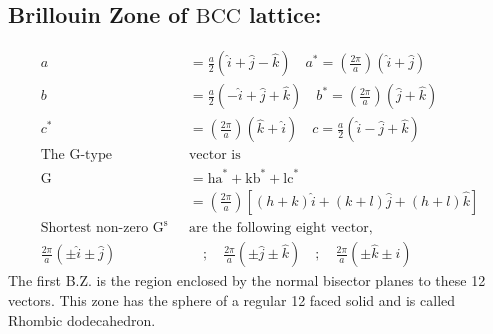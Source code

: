 \subsection{Brillouin Zone of $\mathrm{BCC}$ lattice:}
\begin{align*}
a&=\frac{a}{2}(\hat{i}+\hat{j}-\hat{k}) \quad a^{*}=\left(\frac{2 \pi}{a}\right)(\hat{i}+\hat{j})\\
b&=\frac{a}{2}(-\hat{i}+\hat{j}+\hat{k}) \quad b^{*}=\left(\frac{2 \pi}{a}\right)(\hat{j}+\hat{k})\\
c^{*}&=\left(\frac{2 \pi}{a}\right)(\hat{k}+\hat{i}) \quad  c=\frac{a}{2}(\hat{i}-\hat{j}+\hat{k})\\
\text{The G-type }&\text{vector is}\\
\mathrm{G}&=\mathrm{ha}^{*}+\mathrm{kb}^{*}+\mathrm{lc}^{*}\\
&= \left(\frac{2 \pi}{a}\right)[(h+k) \hat{i}+(k+l) \hat{j}+(h+l) \hat{k}]\\
\text{Shortest non-zero $\mathrm{G}^{\mathrm{s}}$ }&\text{are the following eight vector,}\\
\frac{2 \pi}{a}(\pm \hat{i} \pm \hat{j}) &\quad ;\quad \frac{2 \pi}{a}(\pm \hat{j} \pm \hat{k}) \quad;\quad \frac{2 \pi}{a}(\pm \hat{k} \pm \hat{i})
\end{align*}
The first B.Z. is the region enclosed by the normal bisector planes to these 12 vectors. This zone has the sphere of a regular 12 faced solid and is called Rhombic dodecahedron.

